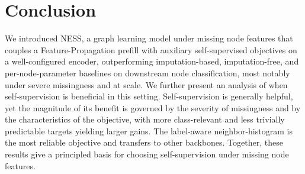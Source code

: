 \section{Conclusion}
\label{sec:conclusion}

We introduced NESS, a graph learning model under missing node features that couples a Feature-Propagation prefill with auxiliary self-supervised objectives on a well-configured encoder, outperforming imputation-based, imputation-free, and per-node-parameter baselines on downstream node classification, most notably under severe missingness and at scale. 
We further present an analysis of when self-supervision is beneficial in this setting. Self-supervision is generally helpful, yet the magnitude of its benefit is governed by the severity of missingness and by the characteristics of the objective, with more class-relevant and less trivially predictable targets yielding larger gains. The label-aware neighbor-histogram is the most reliable objective and transfers to other backbones. Together, these results give a principled basis for choosing self-supervision under missing node features.
